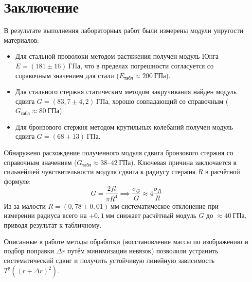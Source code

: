 \documentclass[a4paper, 12pt]{article}
\numberwithin{equation}{section}
\begin{document}
\section{Заключение}
В результате выполнения лабораторных работ были измерены модули упругости материалов:
\begin{itemize}
    \item Для стальной проволоки методом растяжения получен модуль Юнга
	$E = (181 \pm 16)~\text{ГПа}$,
	что в пределах погрешности согласуется со справочным значением
	для стали ($E_{\text{табл}} \approx 200~\text{ГПа}$).

    \item Для стального стержня статическим методом закручивания
	найден модуль сдвига $G = (83{,}7 \pm 4{,}2)~\text{ГПа}$,
	хорошо совпадающий со справочным
	($G_{\text{табл}} \approx 80~\text{ГПа}$).

    \item Для бронзового стержня методом крутильных колебаний
	получен модуль сдвига $G = (68 \pm 13)~\text{ГПа}$.
\end{itemize}

Обнаружено расхождение полученного модуля сдвига бронзового стержня
со справочным значением
($G_{\text{табл}} \approx 38\text{--}42~\text{ГПа}$).
Ключевая причина заключается в сильнейшей чувствительности
модуля сдвига к радиусу стержня $R$ в расчётной формуле:
\begin{equation*}
    G = \frac{2fl}{\pi R^4} \implies \frac{\sigma_G}{G} \approx 4 \frac{\sigma_R}{R}
\end{equation*}
Из-за малости $R = (0{,}78 \pm 0{,}01)~\text{мм}$ систематическое отклонение при измерении радиуса всего на $+0{,}1~\text{мм}$ снижает расчётный модуль $G$ до $\approx 40~\text{ГПа}$, приводя результат к табличному.

Описанные в работе методы обработки
(восстановление массы по изображению и подбор поправки $\Delta r$
путём минимизации невязок)
позволили устранить систематический сдвиг и получить устойчивую
линейную зависимость $T^2((r + \Delta r)^2)$.
\end{document}
